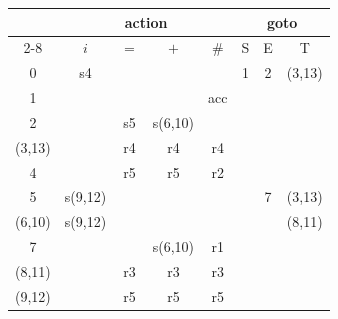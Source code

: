 \documentclass{jarticle}
\begin{document}
\begin{tabular}{|c||c|c|c|c|c|c|c|}\hline
      & \multicolumn{4}{c|}{{\sf action}} & \multicolumn{3}{c|}{{\sf goto}}\\\cline{2-8}
      & $i$ & $=$ & $+$ & $\#$ & S & E & T \\\hline\hline
  0   & s4  &     &     &      & 1 & 2 & (3,13) \\\hline
  1   &     &     &     & acc  &   &   &        \\\hline
  2   &     & s5  & s(6,10) &  &   &   &        \\\hline
(3,13)&     & r4  & r4  & r4   &   &   &        \\\hline
  4   &     & r5  & r5  & r2   &   &   &        \\\hline
  5   & s(9,12)   &     &     &      &   & 7 & (3,13) \\\hline
(6,10)& s(9,12) & &     &      &   &   & (8,11) \\\hline
  7   &     &     & s(6,10) & r1 & &   &        \\\hline
(8,11)&     & r3  & r3  & r3   &   &   &        \\\hline
(9,12)&     & r5  & r5  & r5   &   &   &        \\\hline
\end{tabular}
\end{document}
